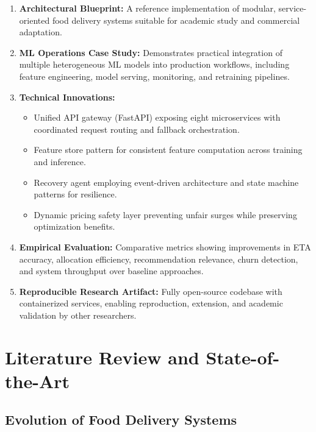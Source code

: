 \documentclass[12pt,a4paper]{report}
\begin{document}
\begin{enumerate}
    \item \textbf{Architectural Blueprint:} A reference implementation of modular, service-oriented food delivery systems suitable for academic study and commercial adaptation.
    
    \item \textbf{ML Operations Case Study:} Demonstrates practical integration of multiple heterogeneous ML models into production workflows, including feature engineering, model serving, monitoring, and retraining pipelines.
    
    \item \textbf{Technical Innovations:} 
    \begin{itemize}
        \item Unified API gateway (FastAPI) exposing eight microservices with coordinated request routing and fallback orchestration.
        \item Feature store pattern for consistent feature computation across training and inference.
        \item Recovery agent employing event-driven architecture and state machine patterns for resilience.
        \item Dynamic pricing safety layer preventing unfair surges while preserving optimization benefits.
    \end{itemize}
    
    \item \textbf{Empirical Evaluation:} Comparative metrics showing improvements in ETA accuracy, allocation efficiency, recommendation relevance, churn detection, and system throughput over baseline approaches.
    
    \item \textbf{Reproducible Research Artifact:} Fully open-source codebase with containerized services, enabling reproduction, extension, and academic validation by other researchers.
\end{enumerate}

\chapter{Literature Review and State-of-the-Art}

\section{Evolution of Food Delivery Systems}
\end{document}

